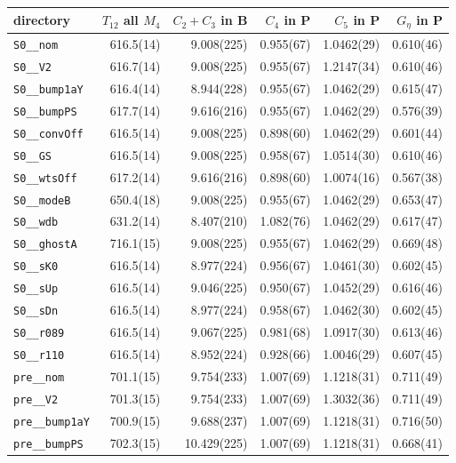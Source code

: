 \begin{tabular}{lrrrrr}
\toprule
directory & $T_{12}$ all $M_4$ & $C_2{+}C_3$ in B & $C_4$ in P & $C_5$ in P & $G_\eta$ in P \\
\midrule
\texttt{S0\_\_nom} & 616.5(14) & 9.008(225) & 0.955(67) & 1.0462(29) & 0.610(46) \\
\texttt{S0\_\_V2} & 616.7(14) & 9.008(225) & 0.955(67) & 1.2147(34) & 0.610(46) \\
\texttt{S0\_\_bump1aY} & 616.4(14) & 8.944(228) & 0.955(67) & 1.0462(29) & 0.615(47) \\
\texttt{S0\_\_bumpPS} & 617.7(14) & 9.616(216) & 0.955(67) & 1.0462(29) & 0.576(39) \\
\texttt{S0\_\_convOff} & 616.5(14) & 9.008(225) & 0.898(60) & 1.0462(29) & 0.601(44) \\
\texttt{S0\_\_GS} & 616.5(14) & 9.008(225) & 0.958(67) & 1.0514(30) & 0.610(46) \\
\texttt{S0\_\_wtsOff} & 617.2(14) & 9.616(216) & 0.898(60) & 1.0074(16) & 0.567(38) \\
\texttt{S0\_\_modeB} & 650.4(18) & 9.008(225) & 0.955(67) & 1.0462(29) & 0.653(47) \\
\texttt{S0\_\_wdb} & 631.2(14) & 8.407(210) & 1.082(76) & 1.0462(29) & 0.617(47) \\
\texttt{S0\_\_ghostA} & 716.1(15) & 9.008(225) & 0.955(67) & 1.0462(29) & 0.669(48) \\
\texttt{S0\_\_sK0} & 616.5(14) & 8.977(224) & 0.956(67) & 1.0461(30) & 0.602(45) \\
\texttt{S0\_\_sUp} & 616.5(14) & 9.046(225) & 0.950(67) & 1.0452(29) & 0.616(46) \\
\texttt{S0\_\_sDn} & 616.5(14) & 8.977(224) & 0.958(67) & 1.0462(30) & 0.602(45) \\
\texttt{S0\_\_r089} & 616.5(14) & 9.067(225) & 0.981(68) & 1.0917(30) & 0.613(46) \\
\texttt{S0\_\_r110} & 616.5(14) & 8.952(224) & 0.928(66) & 1.0046(29) & 0.607(45) \\
\texttt{pre\_\_nom} & 701.1(15) & 9.754(233) & 1.007(69) & 1.1218(31) & 0.711(49) \\
\texttt{pre\_\_V2} & 701.3(15) & 9.754(233) & 1.007(69) & 1.3032(36) & 0.711(49) \\
\texttt{pre\_\_bump1aY} & 700.9(15) & 9.688(237) & 1.007(69) & 1.1218(31) & 0.716(50) \\
\texttt{pre\_\_bumpPS} & 702.3(15) & 10.429(225) & 1.007(69) & 1.1218(31) & 0.668(41) \\

\end{tabular}
